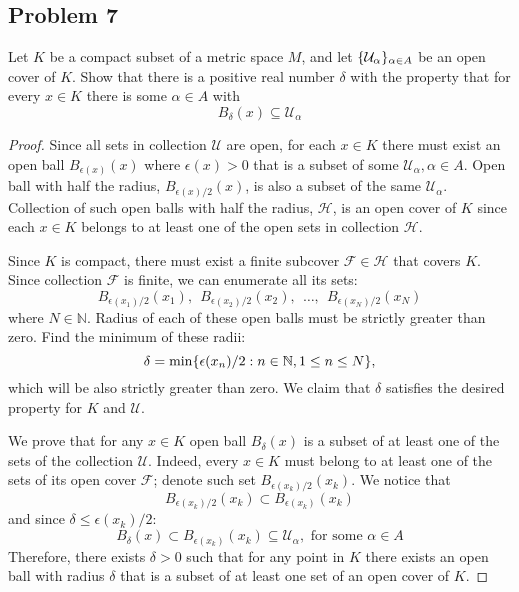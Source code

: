 \documentclass{article}
\newcommand{\N}{\mathbb{N}}
\DeclarePairedDelimiter{\set}{ \{ }{ \} }
\begin{document}
\subsection*{Problem 7}

\begin{tcolorbox}
Let $K$ be a compact subset of a metric space $M$, and let $\set{ \mathcal{U}_\alpha }_{\alpha \in A}$ be an open cover of $K$.
Show that there is a positive real number $\delta$ with the property that for every $x \in K$ there is some $\alpha \in A$ with
\[ B_\delta(x) \subseteq \mathcal{U}_\alpha \]
\end{tcolorbox}

\begin{proof}

Since all sets in collection $\mathcal{U}$ are open, for each $x \in K$ there must exist an open ball $B_{\epsilon(x)}(x)$ where $\epsilon(x) > 0$ that is a subset of some $\mathcal{U}_\alpha, \alpha \in A$.
Open ball with half the radius, $B_{\epsilon(x) / 2}(x)$, is also a subset of the same $\mathcal{U}_\alpha$.
Collection of such open balls with half the radius, $\mathcal{H}$, is an open cover of $K$ since each $x \in K$ belongs to at least one of the open sets in collection $\mathcal{H}$.

Since $K$ is compact, there must exist a finite subcover $\mathcal{F} \in \mathcal{H}$ that covers $K$.
Since collection $\mathcal{F}$ is finite, we can enumerate all its sets:
\[ B_{\epsilon(x_1) / 2}(x_1), \>\> B_{\epsilon(x_2) / 2}(x_2), \>\> \dots, \>\> B_{\epsilon(x_N) / 2}(x_N) \]
where $N \in \N$.
Radius of each of these open balls must be strictly greater than zero.
Find the minimum of these radii:
\[ \delta = \min \set{ \epsilon(x_n) / 2 : n \in \N, 1 \leq n \leq N }, \]
which will be also strictly greater than zero.
We claim that $\delta$ satisfies the desired property for $K$ and $\mathcal{U}$.

We prove that for any $x \in K$ open ball $B_\delta(x)$ is a subset of at least one of the sets of the collection $\mathcal{U}$.
Indeed, every $x \in K$ must belong to at least one of the sets of its open cover $\mathcal{F}$; denote such set $B_{\epsilon(x_k)/2}(x_k)$.
We notice that
\[ B_{\epsilon(x_k)/2}(x_k) \subset B_{\epsilon(x_k)}(x_k)\] 
and since $\delta \leq \epsilon(x_k)/2$:
\[ B_\delta(x) \subset B_{\epsilon(x_k)}(x_k) \subseteq \mathcal{U}_\alpha, \text{ for some } \alpha \in A \]
Therefore, there exists $\delta > 0$ such that for any point in $K$ there exists an open ball with radius $\delta$ that is a subset of at least one set of an open cover of $K$.

\end{proof}
\end{document}
